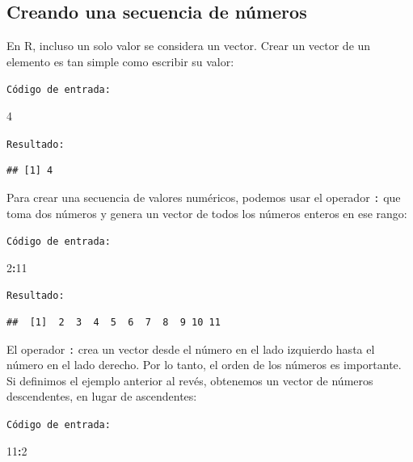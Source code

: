 \documentclass[
]{book}
\newenvironment{Shaded}{\begin{snugshade}}{\end{snugshade}}
\newcommand{\DecValTok}[1]{\textcolor[rgb]{0.00,0.00,0.81}{#1}}
\newcommand{\OperatorTok}[1]{\textcolor[rgb]{0.81,0.36,0.00}{\textbf{#1}}}
\begin{document}
\hypertarget{creando-una-secuencia-de-nuxfameros}{%
\subsection{Creando una secuencia de números}\label{creando-una-secuencia-de-nuxfameros}}

En R, incluso un solo valor se considera un vector. Crear un vector de un elemento es tan simple como escribir su valor:

\texttt{Código\ de\ entrada:}

\begin{Shaded}
\begin{Highlighting}[]
\DecValTok{4}
\end{Highlighting}
\end{Shaded}

\texttt{Resultado:}

\begin{verbatim}
## [1] 4
\end{verbatim}

Para crear una secuencia de valores numéricos, podemos usar el operador \texttt{:} que toma dos números y genera un vector de todos los números enteros en ese rango:

\texttt{Código\ de\ entrada:}

\begin{Shaded}
\begin{Highlighting}[]
\DecValTok{2}\OperatorTok{:}\DecValTok{11}
\end{Highlighting}
\end{Shaded}

\texttt{Resultado:}

\begin{verbatim}
##  [1]  2  3  4  5  6  7  8  9 10 11
\end{verbatim}

El operador \texttt{:} crea un vector desde el número en el lado izquierdo hasta el número en el lado derecho. Por lo tanto, el orden de los números es importante. Si definimos el ejemplo anterior al revés, obtenemos un vector de números descendentes, en lugar de ascendentes:

\texttt{Código\ de\ entrada:}

\begin{Shaded}
\begin{Highlighting}[]
\DecValTok{11}\OperatorTok{:}\DecValTok{2}
\end{Highlighting}
\end{Shaded}
\end{document}
